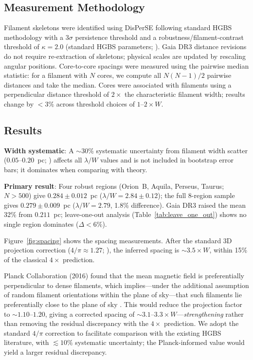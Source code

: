 \documentclass[twoside,twocolumn]{mnras}
\begin{document}
\subsection{Measurement Methodology}

Filament skeletons were identified using DisPerSE \citep{Sousbie2011} following standard
HGBS methodology with a $3\sigma$ persistence threshold and a robustness/filament-contrast
threshold of $\kappa = 2.0$ (standard HGBS parameters; \citealt{Arzoumanian2011}). Gaia DR3 distance revisions
do not require re-extraction of skeletons; physical scales are updated by rescaling
angular positions. Core-to-core spacings were measured using the pairwise median
statistic: for a filament with $N$ cores, we compute all $N(N-1)/2$ pairwise distances
and take the median. Cores were associated with filaments using a perpendicular
distance threshold of $2\times$ the characteristic filament width; results change
by $<3\%$ across threshold choices of $1$--$2\times W$.

\subsection{Results}
\label{sec:results}

\textbf{Width systematic}: A $\sim$30\% systematic uncertainty from filament width
scatter ($0.05$--$0.20$~pc; \citealt{Panopoulou2022}) affects all $\lambda/W$ values
and is not included in bootstrap error bars; it dominates when comparing with theory.

\textbf{Primary result}: Four robust regions (Orion~B, Aquila, Perseus, Taurus;
$N > 500$) give $0.284 \pm 0.012$~pc ($\lambda/W = 2.84 \pm 0.12$); the full 8-region
sample gives $0.279 \pm 0.009$~pc ($\lambda/W = 2.79$, 1.8\% difference).
Gaia DR3 raised the mean 32\% from $0.211$~pc; leave-one-out analysis
(Table~\ref{tab:leave_one_out}) shows no single region dominates ($\Delta < 6\%$).

Figure~\ref{fig:spacing} shows the spacing measurements. After the standard 3D projection
correction ($4/\pi \approx 1.27$; \citealt{Andre2010}), the inferred spacing is
${\sim}3.5\times W$, within 15\% of the classical $4\times$ prediction.

Planck Collaboration (2016) found that the mean magnetic field is preferentially
perpendicular to dense filaments, which implies---under the additional assumption of
random filament orientations within the plane of sky---that such filaments lie
preferentially close to the plane of sky \citep{Planck2016}. This would reduce the
projection factor to ${\sim}1.10$--$1.20$, giving a corrected spacing of
${\sim}3.1$--$3.3\times W$---\textit{strengthening} rather than removing the residual
discrepancy with the $4\times$ prediction. We adopt the standard $4/\pi$ correction
to facilitate comparison with the existing HGBS literature, with $\lesssim10\%$
systematic uncertainty; the Planck-informed value would yield a larger residual discrepancy.
\end{document}
